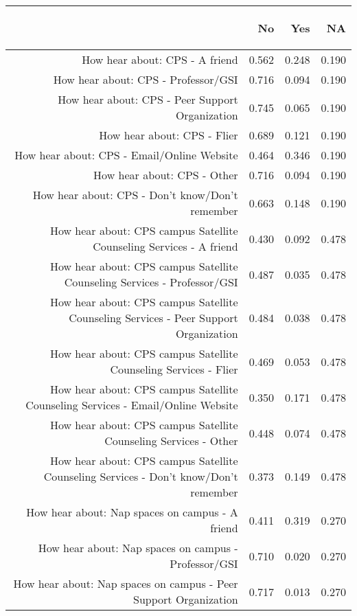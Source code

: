 \documentclass{article}\usepackage[]{graphicx}\usepackage[]{color}
\begin{document}
\begin{table}[ht]
\centering
\begin{tabular}{rrrr}
  \hline
 & \begin{sideways} No \end{sideways} & \begin{sideways} Yes \end{sideways} & \begin{sideways} NA \end{sideways} \\ 
  \hline
How hear about: CPS - A friend & 0.562 & 0.248 & 0.190 \\ 
  How hear about: CPS - Professor/GSI & 0.716 & 0.094 & 0.190 \\ 
  How hear about: CPS - Peer Support Organization & 0.745 & 0.065 & 0.190 \\ 
  How hear about: CPS - Flier & 0.689 & 0.121 & 0.190 \\ 
  How hear about: CPS - Email/Online Website & 0.464 & 0.346 & 0.190 \\ 
  How hear about: CPS - Other & 0.716 & 0.094 & 0.190 \\ 
  How hear about: CPS - Don't know/Don't remember & 0.663 & 0.148 & 0.190 \\ 
  How hear about: CPS campus Satellite Counseling Services - A friend & 0.430 & 0.092 & 0.478 \\ 
  How hear about: CPS campus Satellite Counseling Services - Professor/GSI & 0.487 & 0.035 & 0.478 \\ 
  How hear about: CPS campus Satellite Counseling Services - Peer Support Organization & 0.484 & 0.038 & 0.478 \\ 
  How hear about: CPS campus Satellite Counseling Services - Flier & 0.469 & 0.053 & 0.478 \\ 
  How hear about: CPS campus Satellite Counseling Services - Email/Online Website & 0.350 & 0.171 & 0.478 \\ 
  How hear about: CPS campus Satellite Counseling Services - Other & 0.448 & 0.074 & 0.478 \\ 
  How hear about: CPS campus Satellite Counseling Services - Don't know/Don't remember & 0.373 & 0.149 & 0.478 \\ 
  How hear about: Nap spaces on campus - A friend & 0.411 & 0.319 & 0.270 \\ 
  How hear about: Nap spaces on campus - Professor/GSI & 0.710 & 0.020 & 0.270 \\ 
  How hear about: Nap spaces on campus - Peer Support Organization & 0.717 & 0.013 & 0.270 \\ 

\end{tabular}
\end{table}
\end{document}
